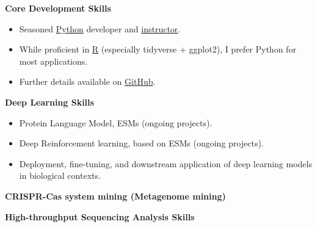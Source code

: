 \textbf{Core Development Skills}\\

\begin{itemize}
    \item Seasoned \underline{Python} developer and \href{https://www.bioinfo.info/p/t_pc/goods_pc_detail/goods_detail/course_2SvfNlIVzrKfOcexHk9Nute5Bhd}{instructor}.
    \item While proficient in \underline{R} (especially tidyverse + ggplot2), I prefer Python for most applications\cite{zhao2025bioat}.
    \item Further details available on \href{https://github.com/hermanzhaozzzz}{GitHub}.
\end{itemize}
\textbf{Deep Learning Skills}
\begin{itemize}
    \item Protein Language Model, ESMs (ongoing projects).
    \item Deep Reinforcement learning, based on ESMs (ongoing projects).
    \item Deployment, fine-tuning, and downstream application of deep learning models in biological contexts.
\end{itemize}

\textbf{CRISPR-Cas system mining (Metagenome mining)}

\textbf{High-throughput Sequencing Analysis Skills}
  
  
  
  




